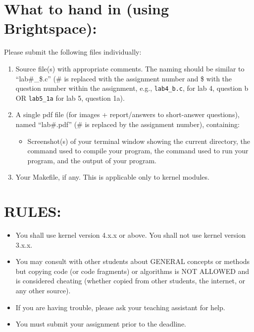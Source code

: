 \documentclass{article}
\begin{document}
\section*{What to hand in (using Brightspace):}

Please submit the following files individually:

\begin{enumerate}
    \item Source file(s) with appropriate comments. The naming should be similar to “lab\#\_\$.c” (\# is replaced with the assignment number and \$ with the question number within the assignment, e.g., \texttt{lab4\_b.c}, for lab 4, question b OR \texttt{lab5\_1a} for lab 5, question 1a).
    \item A single pdf file (for images + report/answers to short-answer questions), named “lab\#.pdf” (\# is replaced by the assignment number), containing:
    \begin{itemize}
        \item Screenshot(s) of your terminal window showing the current directory, the command used to compile your program, the command used to run your program, and the output of your program.
    \end{itemize}
    \item Your Makefile, if any. This is applicable only to kernel modules.
\end{enumerate}


\section*{RULES:}

\begin{itemize}
    \item You shall use kernel version 4.x.x or above. You shall not use kernel version 3.x.x.
    \item You may consult with other students about GENERAL concepts or methods but copying code (or code fragments) or algorithms is NOT ALLOWED and is considered cheating (whether copied from other students, the internet, or any other source).
    \item If you are having trouble, please ask your teaching assistant for help.
    \item You must submit your assignment prior to the deadline.
\end{itemize}
\end{document}
